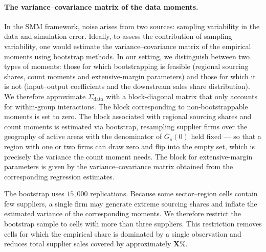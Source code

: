 \paragraph{The variance--covariance matrix of the data moments.} In the SMM framework, noise
arises from two sources: sampling variability in the data and simulation error. Ideally, to
assess the contribution of sampling variability, one would estimate the variance--covariance
matrix of the empirical moments using bootstrap methods. In our setting, we distinguish between
two types of moments: those for which bootstrapping is feasible (regional sourcing shares, count
moments and extensive-margin parameters) and those for which it is not (input--output
coefficients and the downstream sales share distribution). We therefore approximate
$\Sigma_{\mathrm{data}}$ with a block-diagonal matrix that only accounts for within-group
interactions. The block corresponding to non-bootstrappable moments is set to zero. The block
associated with regional sourcing shares and count moments is estimated via bootstrap, resampling
supplier firms over the geography of active areas with the denominator of $\bar G_{s}(0)$ held
fixed --- so that a region with one or two firms can draw zero and flip into the empty set, which
is precisely the variance the count moment needs. The block for extensive-margin parameters is
given by the variance--covariance matrix obtained from the corresponding regression estimates.

The bootstrap uses $15{,}000$ replications. Because some sector--region cells contain few
suppliers, a single firm may generate extreme sourcing shares and inflate the estimated variance
of the corresponding moments. We therefore restrict the bootstrap sample to cells with more than
three suppliers. This restriction removes cells for which the empirical share is dominated by a
single observation and reduces total supplier sales covered by approximately \textbf{X}\%.

